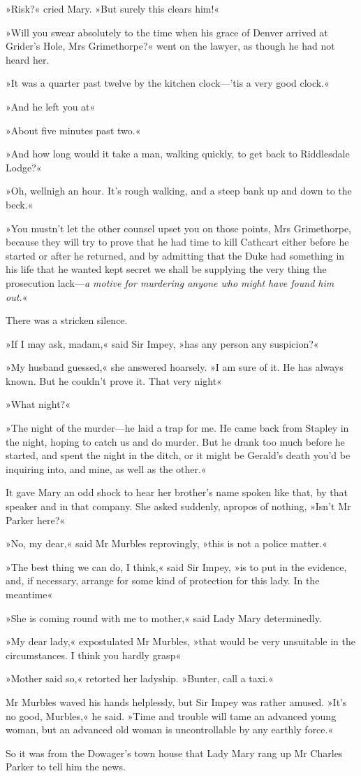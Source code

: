 »Risk?« cried Mary. »But surely this clears him!«

»Will you swear absolutely to the time when his grace of Denver arrived at Grider's Hole, Mrs Grimethorpe?« went on the lawyer, as though he had not heard her.

»It was a quarter past twelve by the kitchen clock—'tis a very good clock.«

»And he left you at\longdash«

»About five minutes past two.«

»And how long would it take a man, walking quickly, to get back to Riddlesdale Lodge?«

»Oh, wellnigh an hour. It's rough walking, and a steep bank up and down to the beck.«

»You mustn't let the other counsel upset you on those points, Mrs Grimethorpe, because they will try to prove that he had time to kill Cathcart either before he started or after he returned, and by admitting that the Duke had something in his life that he wanted kept secret we shall be supplying the very thing the prosecution lack—\textit{a motive for murdering anyone who might have found him out.}«

There was a stricken silence.

»If I may ask, madam,« said Sir Impey, »has any person any suspicion?«

»My husband guessed,« she answered hoarsely. »I am sure of it. He has always known. But he couldn't prove it. That very night\longdash«

»What night?«

»The night of the murder—he laid a trap for me. He came back from Stapley in the night, hoping to catch us and do murder. But he drank too much before he started, and spent the night in the ditch, or it might be Gerald's death you'd be inquiring into, and mine, as well as the other.«

It gave Mary an odd shock to hear her brother's name spoken like that, by that speaker and in that company. She asked suddenly, apropos of nothing, »Isn't Mr Parker here?«

»No, my dear,« said Mr Murbles reprovingly, »this is not a police matter.«

»The best thing we can do, I think,« said Sir Impey, »is to put in the evidence, and, if necessary, arrange for some kind of protection for this lady. In the meantime\longdash«

»She is coming round with me to mother,« said Lady Mary determinedly.

»My dear lady,« expostulated Mr Murbles, »that would be very unsuitable in the circumstances. I think you hardly grasp\longdash«

»Mother said so,« retorted her ladyship. »Bunter, call a taxi.«

Mr Murbles waved his hands helplessly, but Sir Impey was rather amused. »It's no good, Murbles,« he said. »Time and trouble will tame an advanced young woman, but an advanced old woman is uncontrollable by any earthly force.«

So it was from the Dowager's town house that Lady Mary rang up Mr Charles Parker to tell him the news.